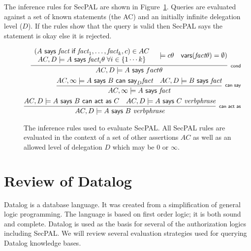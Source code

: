\documentclass[a4paper,sfsidenotes]{tufte-book}
\begin{document}
The inference rules for SecPAL are shown in Figure~\ref{secpal:rules}. Queries
are evaluated against a set of known statements (the \ac{AC}) and an initially
infinite delegation level ($D$). If the rules show that the query is valid then
SecPAL says the statement is okay else it is rejected.

\begin{figure}\label{secpal:rules}
  \centering
  \begin{eqnarray*}
    \infer[\textsf{\scriptsize cond}]{%
      AC, D \models A\textsf{~says~}fact\theta
    }{%
      \begin{array}[c]{c}
        \left(A\textsf{~says~}\textit{fact}\textsf{~if~}\textit{fact}_1, \ldots, \textit{fact}_k, c\right) \in AC \\
        AC,D\models A\textsf{~says~}\textit{fact}_i\theta \; \forall i \in \{1\cdots k\}
      \end{array}
      & \models{c\theta}
      & \textsf{vars}(\textit{fact}\theta) = \emptyset)
    }\\
    \infer[\textsf{\scriptsize can say}]{%
      AC, \infty \models A\textsf{~says~}\textit{fact}
    }{%
      AC, \infty \models A\textsf{~says~}B\textsf{~can~say}_D \textit{fact}
      & AC, D \models B\textsf{~says~}\textit{fact}
    } \\
    \infer[\textsf{\scriptsize can act as}]{%
      AC, D \models A\textsf{~says~}B~\textit{verbphrase}
    }{%
      AC, D \models A\textsf{~says~}B\textsf{~can~act~as~}C
      & AC, D \models A\textsf{~says~}C~\textit{verbphrase}
    }
  \end{eqnarray*}
  \caption{The inference rules used to evaluate {SecPAL}. All {SecPAL} rules are
  evaluated in the context of a set of other assertions $AC$ as well as an
  allowed level of delegation $D$ which may be $0$ or $\infty$.}
\end{figure}


\section{Review of Datalog}

Datalog is a database language. It was created from a simplification of general logic
programming.  The language is based on first order logic; it is both sound and
complete.  Datalog is used as the basis for several of the authorization
logics including SecPAL. We will review several evaluation strategies used
for querying Datalog knowledge bases.
\end{document}
